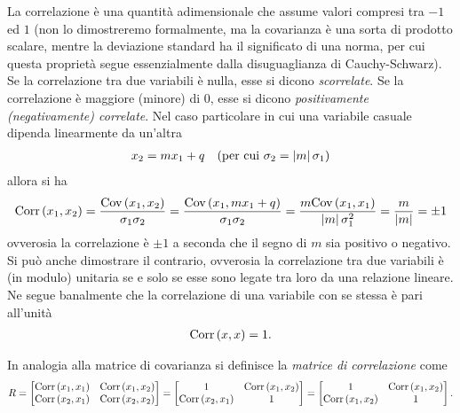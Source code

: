 La correlazione è una quantità adimensionale che assume valori compresi
tra $-1$ ed $1$ (non lo dimostreremo formalmente, ma la covarianza è una
sorta di prodotto scalare, mentre la deviazione standard ha il significato di
una norma, per cui questa proprietà segue essenzialmente dalla disuguaglianza
di Cauchy-Schwarz). Se la correlazione tra due variabili è nulla, esse si
dicono \emph{scorrelate}. Se la correlazione è maggiore (minore) di $0$, esse
si dicono \emph{positivamente (negativamente) correlate}. Nel caso particolare
in cui una variabile casuale dipenda linearmente da un'altra
\begin{align}
  x_2 = mx_1 + q \quad \text{(per cui $\sigma_2 = \left| m \right|\sigma_1$)}
\end{align}
allora si ha
\begin{align}
  \text{Corr}\left(x_1, x_2\right) = \frac{\text{Cov}\left(x_1, x_2\right)}{\sigma_1\sigma_2} =
  \frac{\text{Cov}\left(x_1, mx_1 + q\right)}{\sigma_1\sigma_2} =
  \frac{m\text{Cov}\left(x_1, x_1\right)}{\left| m \right|\sigma_1^2} = \frac{m}{\left| m \right|} = \pm 1
\end{align}
ovverosia la correlazione è $\pm 1$ a seconda che il segno di $m$ sia
positivo o negativo. Si può anche dimostrare il contrario, ovverosia la
correlazione tra due variabili è (in modulo) unitaria se e solo se esse
sono legate tra loro da una relazione lineare. Ne segue banalmente che la
correlazione di una variabile con se stessa è pari all'unità
\begin{align}
  \text{Corr}\left(x, x\right) = 1.
\end{align}

In analogia alla matrice di covarianza si definisce la \emph{matrice di
  correlazione} come
\begin{align}
  R =
  \begin{bmatrix}
    \text{Corr}\left(x_1, x_1\right) & \text{Corr}\left(x_1, x_2\right)\\
    \text{Corr}\left(x_2, x_1\right) & \text{Corr}\left(x_2, x_2\right)
  \end{bmatrix} =
  \begin{bmatrix}
    1 & \text{Corr}\left(x_1, x_2\right)\\
    \text{Corr}\left(x_2, x_1\right) & 1
  \end{bmatrix} =
  \begin{bmatrix}
    1 & \text{Corr}\left(x_1, x_2\right)\\
    \text{Corr}\left(x_1, x_2\right) & 1
  \end{bmatrix}.
\end{align}


\summary

